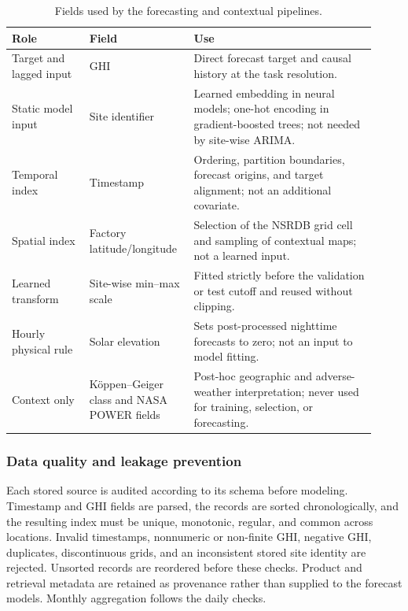 \begin{table}[!t]
\centering
\caption{Fields used by the forecasting and contextual pipelines.}
\label{tab:variables}
\footnotesize
\setlength{\tabcolsep}{3pt}
\renewcommand{\arraystretch}{1.12}
\begin{tabular}{@{}
  >{\raggedright\arraybackslash}p{0.20\linewidth}
  >{\raggedright\arraybackslash}p{0.25\linewidth}
  >{\raggedright\arraybackslash}p{0.47\linewidth}@{}}
\toprule
\textbf{Role} & \textbf{Field} & \textbf{Use} \\
\midrule
Target and lagged input & GHI & Direct forecast target and causal history at
the task resolution. \\
Static model input & Site identifier & Learned embedding in neural models;
one-hot encoding in gradient-boosted trees; not needed by site-wise ARIMA. \\
Temporal index & Timestamp & Ordering, partition boundaries, forecast origins,
and target alignment; not an additional covariate. \\
Spatial index & Factory latitude/longitude & Selection of the NSRDB grid cell
and sampling of contextual maps; not a learned input. \\
Learned transform & Site-wise min--max scale & Fitted strictly before the
validation or test cutoff and reused without clipping. \\
Hourly physical rule & Solar elevation & Sets post-processed nighttime
forecasts to zero; not an input to model fitting. \\
Context only & K\"oppen--Geiger class and NASA POWER fields & Post-hoc
geographic and adverse-weather interpretation; never used for training,
selection, or forecasting. \\
\bottomrule
\end{tabular}
\end{table}

\subsubsection{Data quality and leakage prevention}

Each stored source is audited according to its schema before modeling.
Timestamp and GHI fields are parsed, the records are sorted chronologically,
and the resulting index must be unique, monotonic, regular, and common across
locations. Invalid timestamps, nonnumeric or non-finite GHI, negative GHI,
duplicates, discontinuous grids, and an inconsistent stored site identity are
rejected. Unsorted records are reordered before these checks. Product and
retrieval metadata are retained as provenance rather than supplied to the
forecast models. Monthly aggregation follows the daily checks.

